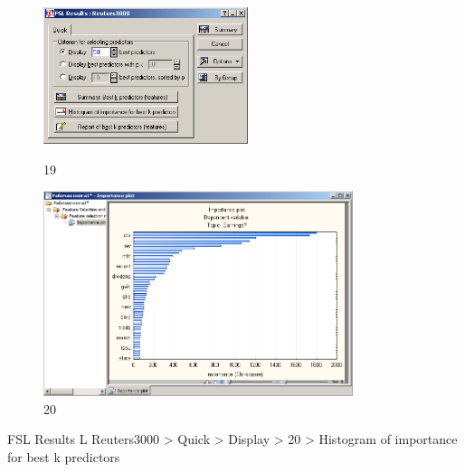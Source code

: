\begin{figure}[!h]
  \centering

  \begin{minipage}{0.29\textwidth}
    \centering

    \includegraphics[height=4cm]
    {inc/19.PNG}

    \caption{19}

    \label{fig:19}
  \end{minipage}
  \begin{minipage}{0.69\textwidth}
    \centering

    \includegraphics[height=6cm]
    {inc/20.PNG}

    \caption{20}

    \label{fig:20}
  \end{minipage}
\end{figure}

FSL Results L Reuters3000 > Quick > Display > 20 > Histogram of importance for best k predictors

